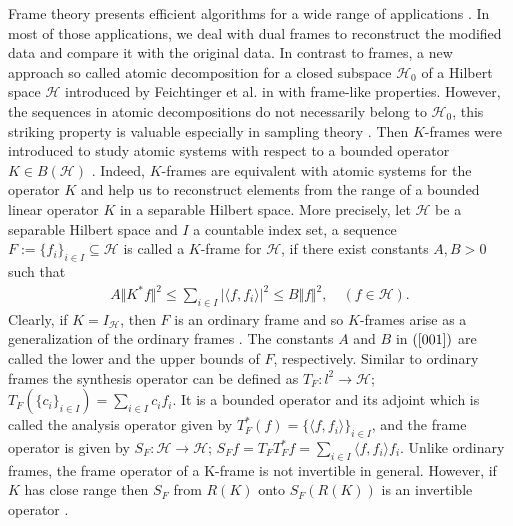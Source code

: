 \documentclass{birkjour}
\theoremstyle{definition}
\theoremstyle{remark}
\numberwithin{equation}{section}
\begin{document}
\smallskip
\goodbreak
Frame theory presents  efficient algorithms for a wide range of applications \cite{Ar13, Ben06, Bod05, Bol98, Cas00}.
In most of  those applications, we deal with  dual frames to reconstruct the modified data and compare it with the original data. In contrast to frames, a new approach so called atomic decomposition for a closed subspace $\mathcal{H}_{0}$ of a Hilbert space $\mathcal{H}$ introduced by  Feichtinger et al.  in \cite{Han} 
 with frame-like properties. However, the sequences in  atomic decompositions
do not necessarily  belong to $\mathcal{H}_{0}$,  this striking property is valuable especially   in sampling theory   \cite{Paw, Werthrt}. Then $K$-frames were introduced  to study atomic systems with respect to a bounded operator $K\in B(\mathcal{H})$ \cite{Gav07}. Indeed, $K$-frames   are equivalent with atomic systems for the operator $K$  and  help us to reconstruct elements from the range of a bounded linear operator $K$ in a separable Hilbert space.
More precisely, let  $\mathcal{H}$ be a separable Hilbert space and $I$  a countable index set, a sequence $F:=\lbrace f_{i}\rbrace_{i \in I} \subseteq \mathcal{H}$ is called a $K$-frame for $\mathcal{H}$, if there exist constants $A, B > 0$ such that
\begin{eqnarray}\label{001}
A \Vert K^{*}f\Vert^{2} \leq \sum_{i\in I} \vert \langle f,f_{i}\rangle\vert^{2} \leq B \Vert f\Vert^{2}, \quad (f\in \mathcal{H}).
\end{eqnarray}
Clearly, if $K=I_{\mathcal{H}}$, then $F$ is an ordinary frame and so $K$-frames arise  as a generalization of the ordinary frames  \cite{Cas00, Chr08, Gav07}. The constants $A$ and $B$ in $(\ref{001})$ are called the lower and the upper bounds of $F$, respectively. Similar to ordinary frames the synthesis operator can be defined as $T_{F}: l^{2}\rightarrow \mathcal{H}$; $T_{F}(\{ c_{i}\}_{i\in I}) = \sum_{i\in I} c_{i}f_{i}$. It is a bounded operator and its adjoint which is called the analysis operator given by $T_{F}^{*}(f)= \{ \langle f,f_{i}\rangle\}_{i\in I}$, and the frame operator is given by $S_{F}: \mathcal{H} \rightarrow \mathcal{H}$; $S_{F}f = T_{F}T_{F}^{*}f = \sum_{i\in I}\langle f,f_{i}\rangle f_{i}$. Unlike ordinary frames, the frame operator of a K-frame is not invertible in general. However,  if $K$ has close range then $S_{F}$ from $R(K)$ onto $S_{F}(R(K))$ is an invertible operator \cite{Xiao}.
\end{document}
